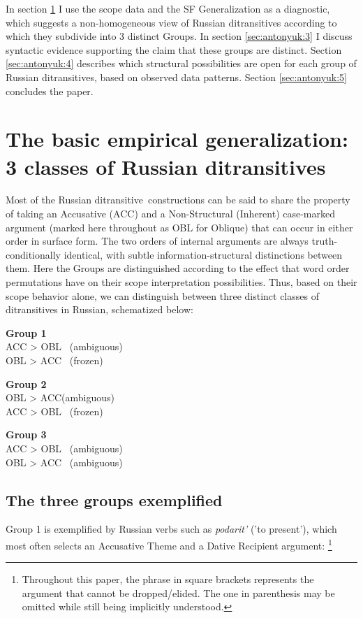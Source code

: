 \documentclass[output=paper,colorlinks,citecolor=brown]{./langscibook}
\begin{document}
In section \ref{sec:antonyuk:2} I use the scope data and the SF Generalization as a diagnostic, which suggests a non-homogeneous view of Russian ditransitives according to which they subdivide into 3 distinct Groups. In section \ref{sec:antonyuk:3} I discuss syntactic evidence supporting the claim that these groups are distinct. Section \ref{sec:antonyuk:4} describes which structural possibilities are open for each group of Russian ditransitives, based on observed data patterns. Section \ref{sec:antonyuk:5} concludes the paper. 

\section{The basic empirical generalization: 3 classes of Russian ditransitives}\label{sec:antonyuk:2}

Most of the Russian ditransitive~constructions can be said to share the property of taking an Accusative (ACC) and a Non-Structural (Inherent) case-marked argument (marked here throughout as OBL for Oblique) that can occur in either order in surface form. The two orders of internal arguments are always truth-conditionally identical, with subtle information-structural distinctions between them. Here the Groups are distinguished according to the effect that word order permutations have on their scope interpretation possibilities. Thus, based on their scope behavior alone, we can distinguish between three distinct classes of ditransitives in Russian, schematized below:

\ea%
    \label{ex:antonyuk:9}
    \textbf{Group 1}\\
    ACC > OBL ~(ambiguous)\\
    OBL > ACC ~(frozen)
    \z

\ea%
    \label{ex:antonyuk:10}
    \textbf{Group 2}\\
    OBL > ACC(ambiguous)\\
    ACC > OBL ~(frozen)
    \z

\ea%
    \label{ex:antonyuk:11}
    \textbf{Group 3}\\
    ACC > OBL ~(ambiguous)\\
    OBL > ACC ~(ambiguous)
    \z

\subsection{The three groups exemplified}\label{sec:antonyuk:2.1}

Group 1 is exemplified by Russian verbs such as \textit{podarit’} ('to present’), which most often selects an Accusative Theme and a Dative Recipient argument: \footnote{Throughout this paper, the phrase in square brackets represents the argument that cannot be dropped/elided. The one in parenthesis may be omitted while still being implicitly understood.} 
\end{document}
